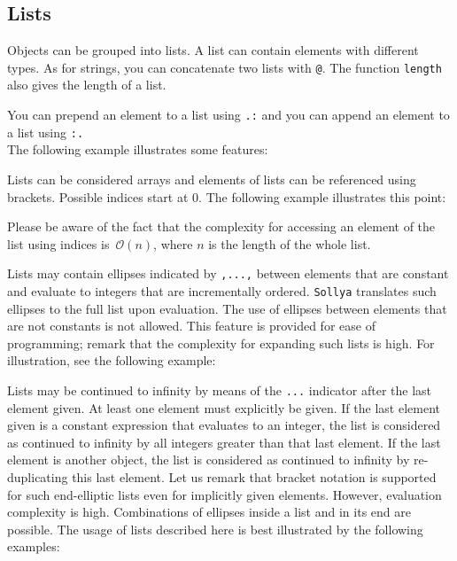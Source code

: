 \documentclass[a4paper]{article}
\newcommand{\com}[1]{\texttt{#1}}
\newcommand{\sollya}{\texttt{Sollya}\xspace}
\begin{document}
\subsection{Lists}
Objects can be grouped into lists. A list can contain elements with different types. As for strings, you can concatenate two lists with \com{@}. The function \com{length} also gives the length of a list.

You can prepend an element to a list using \com{.:} and you can append an element to a list using \com{:.}\\ The following example illustrates some features:



Lists can be considered arrays and elements of lists can be
referenced using brackets. Possible indices start at $0$. The
following example illustrates this point:



Please be aware of the fact that the complexity for accessing an
element of the list using indices is~$\mathcal{O}(n)$, where $n$ is the length of the whole list.

Lists may contain ellipses indicated by \texttt{,...,} between
elements that are constant and evaluate to integers that are
incrementally ordered. \sollya translates such ellipses to the full
list upon evaluation. The use of ellipses between elements that are not
constants is not allowed. This feature is provided for ease of
programming; remark that the complexity for expanding such lists is
high. For illustration, see the following example:



Lists may be continued to infinity by means of the \texttt{...}
indicator after the last element given. At least one element must
explicitly be given. If the last element given is a constant
expression that evaluates to an integer, the list is considered as
continued to infinity by all integers greater than that last
element. If the last element is another object, the list is considered
as continued to infinity by re-duplicating this last element. Let us remark
that bracket notation is supported for such end-elliptic lists even
for implicitly given elements. However, evaluation complexity is
high. Combinations of ellipses inside a list and in its end are
possible. The usage of lists described here is best illustrated by the
following examples:


\end{document}
